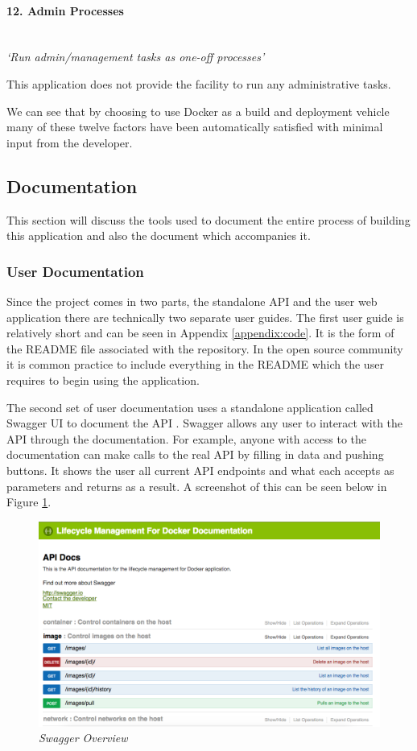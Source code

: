 \paragraph{12. Admin Processes}\mbox{}\\
\textit{`Run admin/management tasks as one-off processes'}

This application does not provide the facility to run any administrative tasks.

We can see that by choosing to use Docker as a build and deployment vehicle many of these twelve factors have been automatically satisfied with minimal input from the developer.

\subsection{Documentation}
This section will discuss the tools used to document the entire process of building this application and also the document which accompanies it.
\subsubsection{User Documentation}
Since the project comes in two parts, the standalone API and the user web application there are technically two separate user guides. The first user guide is relatively short and can be seen in Appendix \ref{appendix:code}. It is the form of the README file associated with the repository. In the open source community it is common practice to include everything in the README which the user requires to begin using the application. 

The second set of user documentation uses a standalone application called Swagger UI to document the API \citep{Swagger2017}. Swagger allows any user to interact with the API through the documentation. For example, anyone with access to the documentation can make calls to the real API by filling in data and pushing buttons. It shows the user all current API endpoints and what each accepts as parameters and returns as a result. A screenshot of this can be seen below in Figure \ref{fig:swagger-overview}. 

\begin{figure}[!ht]
\centering
\includegraphics*[width=\textwidth]{images/swagger-overview}
\caption{\em Swagger Overview}
\label{fig:swagger-overview}
\end{figure}

